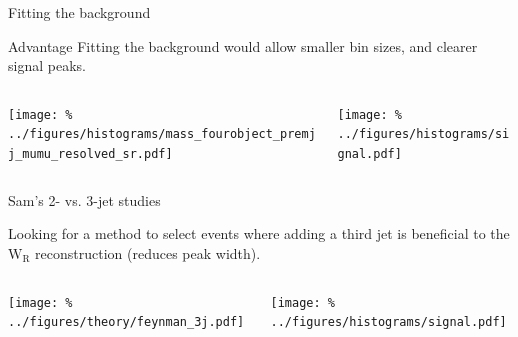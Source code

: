\documentclass[aspectratio=169]{beamer}
\begin{document}
\begin{frame}{Fitting the background}
  \begin{block}{Advantage}
    Fitting the background would allow smaller bin sizes, and clearer signal peaks.
  \end{block}
  \begin{columns}
    \begin{column}{0.45\textwidth}
      \centering
      \texttt{[image: \%
        ../figures/histograms/mass\_fourobject\_premjj\_mumu\_resolved\_sr.pdf]}
    \end{column}
    \begin{column}{0.45\textwidth}
      \centering
      \texttt{[image: \%
         ../figures/histograms/signal.pdf]}
    \end{column}
  \end{columns}
\end{frame}

\begin{frame}{Sam's 2- vs. 3-jet studies}
  \begin{block}{}
    Looking for a method to select events where adding a third jet is beneficial to the $\mathrm{W_R}$ reconstruction (reduces peak width).
  \end{block}
  \begin{columns}
    \begin{column}{0.45\textwidth}
      \centering
      \texttt{[image: \%
        ../figures/theory/feynman\_3j.pdf]}
    \end{column}
    \begin{column}{0.45\textwidth}
      \centering
      \texttt{[image: \%
         ../figures/histograms/signal.pdf]}
    \end{column}
  \end{columns}
\end{frame}

\begin{backup}
\end{backup}
\end{document}

